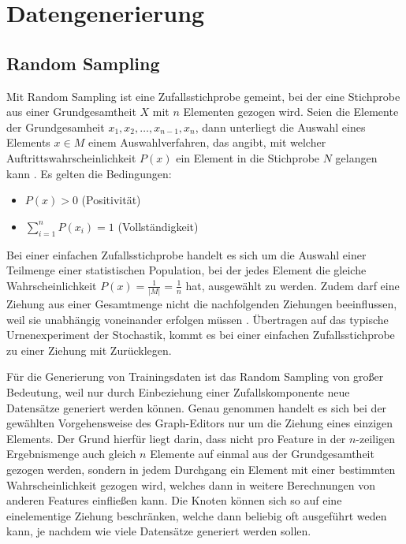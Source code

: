 
\chapter{Datengenerierung}

\section{Random Sampling}

Mit Random Sampling ist eine Zufallsstichprobe gemeint, bei der eine Stichprobe aus einer Grundgesamtheit $X$ mit $n$ Elementen gezogen wird. Seien die Elemente der Grundgesamheit $x_1,x_2,\dots,x_{n-1},x_n$, dann unterliegt die Auswahl eines Elements $x \in M$ einem Auswahlverfahren, das angibt, mit welcher Auftrittswahrscheinlichkeit $P(x)$ ein Element in die Stichprobe $N$ gelangen kann \cite{RandomSampling}.
Es gelten die Bedingungen:
\begin{itemize}
    \item $P(x) > 0$ (Positivität)
    \item $\sum_{i=1}^{n}P(x_i)=1$ (Vollständigkeit)
\end{itemize}

Bei einer einfachen Zufallsstichprobe handelt es sich um die Auswahl einer Teilmenge einer statistischen Population, bei der jedes Element die gleiche Wahrscheinlichkeit $P(x)=\frac{1}{\lvert M \rvert}=\frac{1}{n}$ hat, ausgewählt zu werden. Zudem darf eine Ziehung aus einer Gesamtmenge nicht die nachfolgenden Ziehungen beeinflussen, weil sie unabhängig voneinander erfolgen müssen \cite{RandomSampling}. Übertragen auf das typische Urnenexperiment der Stochastik, kommt es bei einer einfachen Zufallsstichprobe zu einer Ziehung mit Zurücklegen.

Für die Generierung von Trainingsdaten ist das Random Sampling von großer Bedeutung, weil nur durch Einbeziehung einer Zufallskomponente neue Datensätze generiert werden können. Genau genommen handelt es sich bei der gewählten Vorgehensweise des Graph-Editors nur um die Ziehung eines einzigen Elements. Der Grund hierfür liegt darin, dass nicht pro Feature in der $n$-zeiligen Ergebnismenge auch gleich $n$ Elemente auf einmal aus der Grundgesamtheit gezogen werden, sondern in jedem Durchgang ein Element mit einer bestimmten Wahrscheinlichkeit gezogen wird, welches dann in weitere Berechnungen von anderen Features einfließen kann. Die Knoten können sich so auf eine einelementige Ziehung beschränken, welche dann beliebig oft ausgeführt weden kann, je nachdem wie viele Datensätze generiert werden sollen.

